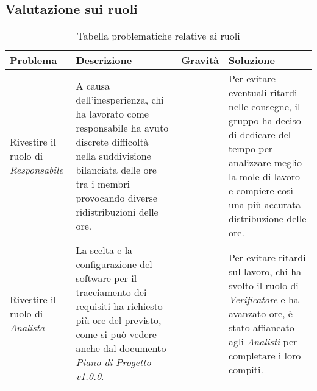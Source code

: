 \subsection{Valutazione sui ruoli}
\begin{table}[H]
	
	\begin{longtable}{ >{\centering}p{} >{\centering}p{}
			>{\centering}p{} >{\centering}p{}}
			
		\hline
		\rowcolorhead
		\textbf{\color{white}Problema} 
		& \textbf{\color{white}Descrizione} 
		& \centering\textbf{\color{white}Gravità}
		& \textbf{\color{white}Soluzione} 
		\tabularnewline \hline 	
		
		Rivestire il ruolo di \textit{Responsabile} &
		A causa dell'inesperienza, chi ha lavorato come responsabile ha avuto discrete
		difficoltà nella suddivisione bilanciata delle ore tra i membri provocando 
		diverse ridistribuzioni delle ore. &
		3 &
		Per evitare eventuali ritardi nelle consegne, il gruppo ha deciso di dedicare 
		del tempo per analizzare meglio la mole di lavoro e compiere così una più
		accurata distribuzione delle ore.
						
		\tabularnewline 
		Rivestire il ruolo di \textit{Analista} &
		La scelta e la configurazione del software per il tracciamento dei requisiti
		ha richiesto più ore del previsto, come si può vedere anche dal documento
		\textit{Piano di Progetto v1.0.0}. &
		2 &
		Per evitare ritardi sul lavoro, chi ha svolto il ruolo di \textit{Verificatore}
		e ha avanzato ore, è stato affiancato agli \textit{Analisti} per completare 
		i loro compiti.
			
	\end{longtable}
	\caption{Tabella problematiche relative ai ruoli}	
\end{table}


